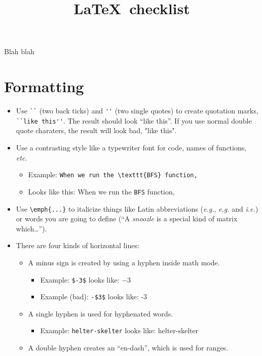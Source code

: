 \documentclass{article}
\title{\protect\LaTeX\ checklist}
\begin{document}
\maketitle

Blah blah

\section*{Formatting}
\label{sec:formatting}

\begin{itemize}
\item Use \verb|``| (two back ticks) and \verb|''| (two single quotes)
  to create quotation marks, \verb|``like this''|.  The result should
  look ``like this''.  If you use normal double quote charaters, the
  result will look bad, "like this".
\item Use a contrasting style like a typewriter font for code, names
  of functions, \emph{etc.}
  \begin{itemize}
  \item Example: \verb|When we run the \texttt{BFS} function,|
  \item Looks like this: When we run the \texttt{BFS} function,
  \end{itemize}
\item Use \verb|\emph{...}| to italicize things like Latin abbreviations
  (\emph{e.g.}, \emph{e.g.} and \emph{i.e.}) or words you are going to
  define (``A \emph{snoozle} is a special kind of matrix which\dots'').
\item There are four kinds of horizontal lines:
  \begin{itemize}
  \item A minus sign is created by using a hyphen inside math mode.
    \begin{itemize}
    \item Example: \verb|$-3$| looks like: $-3$
    \item Example (bad): \verb|-$3$| looks like: -$3$
    \end{itemize}
  \item A single hyphen is used for hyphenated words.
    \begin{itemize}
    \item Example: \verb|helter-skelter| looks like: helter-skelter
    \end{itemize}
  \item A double hyphen creates an ``en-dash'', which is used for
    ranges.
    \begin{itemize}

\end{itemize}
\end{itemize}
\end{itemize}
\end{document}
